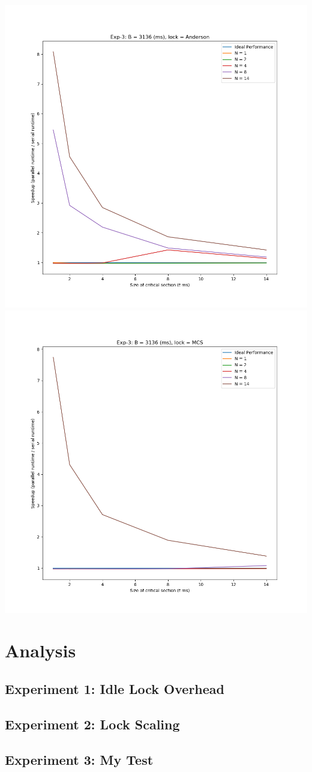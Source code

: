 \documentclass[]{article}
\begin{document}
\includegraphics[scale=0.5]{graphs/exp3_a.png}\\
\includegraphics[scale=0.5]{graphs/exp3_m.png}\\%

\section{Analysis}

\subsection{Experiment 1: Idle Lock Overhead}

\subsection{Experiment 2: Lock Scaling}

\subsection{Experiment 3: My Test}
\end{document}
